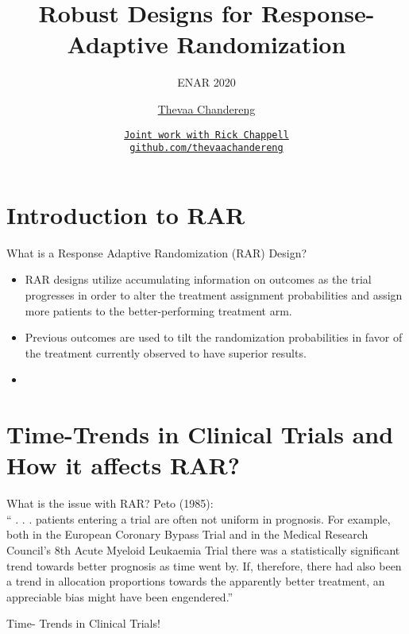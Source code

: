 \documentclass[12pt,t]{beamer}
\title{Robust Designs for Response-Adaptive Randomization}
\subtitle{ENAR 2020}
\author{\href{https://thevaachandereng.github.io/}{Thevaa Chandereng}}
\institute{\href{https://www.biostat.wisc.edu}{Biostatistics \& Medical Informatics} \\[2pt] \href{http://www.wisc.edu}{University of Wisconsin{\textendash}Madison}}
\date{\href{Joint work with Rick Chappell}{\tt \scriptsize Joint work with Rick Chappell}
\\[-4pt]
\href{https://github.com/thevaachandereng}{\tt \scriptsize github.com/thevaachandereng}
\\[-4pt]
}
\newcommand{\bi}{\begin{itemize}}
\newcommand{\ei}{\end{itemize}}
\begin{document}
{
 }


\section{Introduction to RAR}

\begin{frame}{What is a Response Adaptive Randomization (RAR) Design?}

\bi
\itemsep6pt
\item RAR designs utilize accumulating information on outcomes as the trial progresses in order to alter the treatment assignment probabilities and assign more patients to the better-performing treatment arm.
\item Previous outcomes are used to tilt the randomization probabilities in favor of the treatment currently observed to have superior results.
\item {}
\ei
    
\end{frame}


\section{Time-Trends in Clinical Trials and How it affects RAR?}

\begin{frame}{What is the issue with RAR?}
Peto (1985): \\
“ . . . patients entering a trial are often not uniform in prognosis.  For example, both in the European Coronary Bypass Trial and in the Medical Research Council’s 8th Acute Myeloid Leukaemia Trial {\color{vhilight} there was a statistically significant trend} towards better prognosis as time went by.  If, therefore, there had also been a trend in allocation proportions towards the apparently better treatment, an appreciable bias might have been engendered.”

\vspace{12pt}

{\color{hilight} Time- Trends in Clinical Trials!}

\end{frame}
\end{document}
